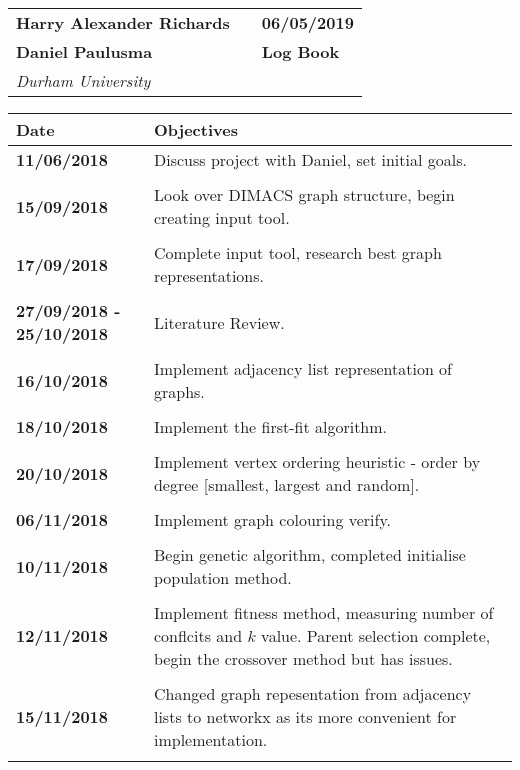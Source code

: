 \documentclass[12pt,a4paper]{article}
\begin{document}
\begin{tabular}[t]{p{}  p{}  p{}}
  \textbf{Harry Alexander Richards}  & & \textbf{06/05/2019} \\
  \textbf{Daniel Paulusma} & & \textbf{Log Book} \\
  \textit{Durham University} & & 
\end{tabular}

\vspace{1cm}



\begin{longtable}{ p{} | p{} } 
\toprule
\hline 
\textbf{Date} & \textbf{Objectives} \\
\hline
\textbf{11/06/2018} & Discuss project with Daniel, set initial goals.  \\  \\
\textbf{15/09/2018} & Look over DIMACS graph structure, begin creating input tool.  \\  \\
\textbf{17/09/2018} & Complete input tool, research best graph representations.  \\  \\ 
\textbf{27/09/2018 - 25/10/2018}& Literature Review.  \\  \\  
\textbf{16/10/2018} & Implement adjacency list representation of graphs.  \\  \\  
\textbf{18/10/2018} & Implement the first-fit algorithm.  \\  \\  
\textbf{20/10/2018} & Implement vertex ordering heuristic - order by degree [smallest, largest and random].  \\  \\  
\textbf{06/11/2018} & Implement graph colouring verify.  \\  \\  
\textbf{10/11/2018} & Begin genetic algorithm, completed initialise population method.  \\  \\  
\textbf{12/11/2018} & Implement fitness method, measuring number of conflcits and $k$ value. Parent selection complete,  begin the crossover method but has issues.  \\  \\ 
\textbf{15/11/2018} & Changed graph repesentation from adjacency lists to networkx as its more convenient for implementation. \\  \\ 

\end{longtable}
\end{document}

